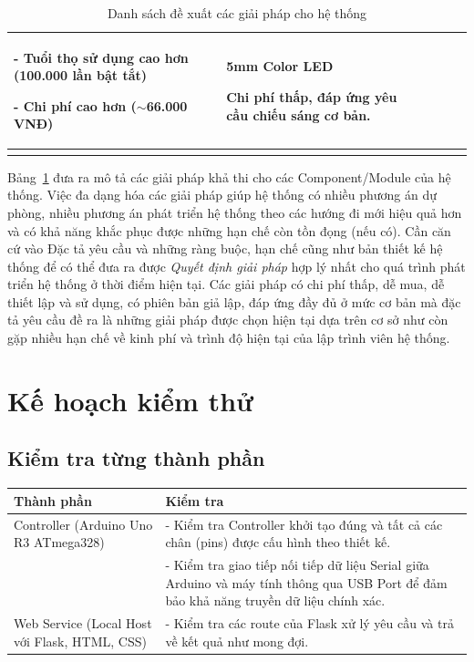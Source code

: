 {{\begin{longtable}{|p{2.3cm}|p{3.2cm}|p{3.2cm}|p{3.2cm}|p{3.5cm}|}
- Tuổi thọ sử dụng cao hơn (100.000 lần bật tắt)


- Chi phí cao hơn ($\sim$66.000 VNĐ) 

& \textbf{5mm Color LED}


Chi phí thấp, đáp ứng yêu cầu chiếu sáng cơ bản. \\ \hline

\caption{Danh sách đề xuất các giải pháp cho hệ thống}
\label{tab:sugg}
\end{longtable}

}

Bảng~\ref{tab:sugg} đưa ra mô tả các giải pháp khả thi cho các Component/Module của hệ thống. Việc đa dạng hóa các giải pháp giúp hệ thống có nhiều phương án dự phòng, nhiều phương án phát triển hệ thống theo các hướng đi mới hiệu quả hơn và có khả năng khắc phục được những hạn chế còn tồn đọng (nếu có). Cần căn cứ vào Đặc tả yêu cầu và những ràng buộc, hạn chế cũng như bản thiết kế hệ thống để có thể đưa ra được \textit{Quyết định giải pháp} hợp lý nhất cho quá trình phát triển hệ thống ở thời điểm hiện tại. Các giải pháp có chi phí thấp, dễ mua, dễ thiết lập và sử dụng, có phiên bản giả lập, đáp ứng đầy đủ ở mức cơ bản mà đặc tả yêu cầu đề ra là những giải pháp được chọn hiện tại dựa trên cơ sở như còn gặp nhiều hạn chế về kinh phí và trình độ hiện tại của lập trình viên hệ thống. 


\pagebreak
\section{Kế hoạch kiểm thử}
\subsection{Kiểm tra từng thành phần}
\begin{table}[h!]
\centering
\small
\begin{tabular}{|p{4cm}|p{10cm}|}
\hline
\textbf{Thành phần} & \textbf{Kiểm tra} \\ \hline
Controller (Arduino Uno R3 ATmega328) & - Kiểm tra Controller khởi tạo đúng và tất cả các chân (pins) được cấu hình theo thiết kế. \\
& - Kiểm tra giao tiếp nối tiếp dữ liệu Serial giữa Arduino và máy tính thông qua USB Port để đảm bảo khả năng truyền dữ liệu chính xác. \\ \hline
Web Service (Local Host với Flask, HTML, CSS) & - Kiểm tra các route của Flask xử lý yêu cầu và trả về kết quả như mong đợi.



\end{tabular}
\end{table}}
